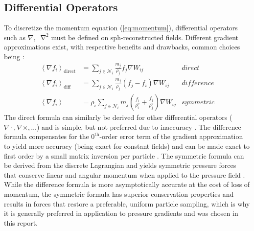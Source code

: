 \documentclass[conference]{IEEEtran}
\newcommand*\Laplace{\mathop{}\!\mathbin\nabla^2}
\newcommand\br[1]{\left(#1\right)}
\newcommand\abr[1]{\left\langle#1\right\rangle}
\newcommand\divergence{{\nabla\cdot}}
\begin{document}



\subsection{Differential Operators}
To discretize the momentum equation (\autoref{eq:momentum}), differential operators such as $\nabla, \Laplace$ must be defined on \ac{sph}-reconstructed fields. Different  gradient approximations exist, with respective benefits and drawbacks, common choices being \cite{tutorial2019}:
\begin{align}
  \abr{\nabla f_i}_{\text{direct}} &=\sum_{j\in\mathcal{N}_i} \frac{m_j}{\rho_j} f_j \nabla W_{ij} &\textit{direct}\\
  \abr{\nabla f_i}_{\text{diff}} &=\sum_{j\in\mathcal{N}_i} \frac{m_j}{\rho_j} \br{f_j - f_i} \nabla W_{ij} &\textit{difference}\\
  \abr{\nabla f_i} &= \rho_i \sum_{j\in\mathcal{N}_i} m_j \br{\frac{f_i}{\rho_i^2} + \frac{f_j}{\rho_j^2}} \nabla W_{ij} &\textit{symmetric}\label{eq:symmetric-formula}
\end{align}
The direct formula can similarly be derived for other differential operators ($\divergence, \nabla\times, \dots$) and is simple, but not preferred due to inaccuracy \cite{tutorial2019}. The difference formula compensates for the $0^\text{th}$-order error term of the gradient approximation to yield more accuracy (being exact for constant fields) and can be made exact to first order by a small matrix inversion per particle \autocites{price2012}{tutorial2019}. The symmetric formula can be derived from the discrete Lagrangian and yields symmetric pressure forces that conserve linear and angular momentum when applied to the pressure field \autocites{price2012}{tutorial2019}. While the difference formula is more asymptotically accurate at the cost of loss of momentum, the symmetric formula has superior conservation properties and results in forces that restore a preferable, uniform particle sampling, which is why it is generally preferred \cite{tutorial2019} in application to pressure gradients and was chosen in this report.
\end{document}
